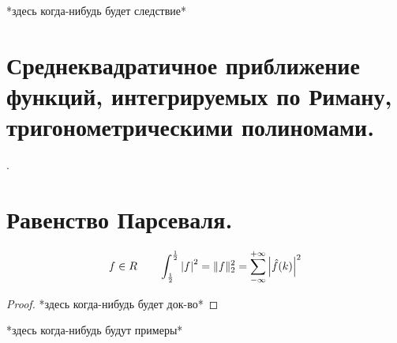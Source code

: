 \documentclass[matan]{subfiles}
\begin{document}
  \begin{consequence}[4]
    *здесь когда-нибудь будет следствие*
  \end{consequence}

  \newpage
  \section{Среднеквадратичное приближение функций, интегрируемых по Риману, тригонометрическими полиномами.}
  \begin{consequence}
    .
  \end{consequence}

  \newpage
  \section{Равенство Парсеваля.}
  \begin{consequence}
    \[f \in R \qquad \int_{\frac{1}{2}}^{\frac{1}{2}} \left|f\right|^2 = \lVert f \rVert^2_2 = \sum_{-\infty}^{+\infty} \left|\hat{f}(k)\right|^2\]
  \end{consequence}

  \begin{proof}
    *здесь когда-нибудь будет док-во*
  \end{proof}

  \begin{examples}
    *здесь когда-нибудь будут примеры*
  \end{examples}
\end{document}

